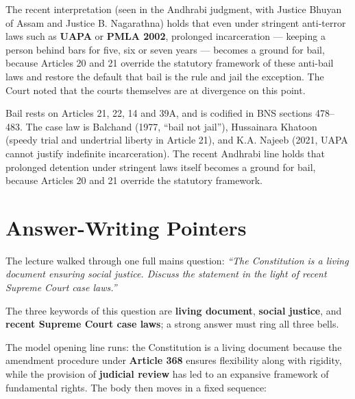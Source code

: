 \begin{CriticalPoint}
The recent interpretation (seen in the Andhrabi judgment, with Justice Bhuyan of Assam and
Justice B. Nagarathna) holds that even under stringent anti-terror laws such as
\textbf{UAPA} or \textbf{PMLA 2002}, prolonged incarceration — keeping a person behind
bars for five, six or seven years — becomes a ground for bail, because Articles 20 and 21
override the statutory framework of these anti-bail laws and restore the default that bail
is the rule and jail the exception. The Court noted that the courts themselves are at
divergence on this point.
\end{CriticalPoint}

\begin{QuickRevision}
Bail rests on Articles 21, 22, 14 and 39A, and is codified in BNS sections 478--483. The
case law is Balchand (1977, ``bail not jail''), Hussainara Khatoon (speedy trial and
undertrial liberty in Article 21), and K.A. Najeeb (2021, UAPA cannot justify indefinite
incarceration). The recent Andhrabi line holds that prolonged detention under stringent
laws itself becomes a ground for bail, because Articles 20 and 21 override the statutory
framework.
\end{QuickRevision}

\section*{Answer-Writing Pointers}

The lecture walked through one full mains question: \emph{``The Constitution is a living
document ensuring social justice. Discuss the statement in the light of recent Supreme
Court case laws.''}

\begin{PYQLink}
The three keywords of this question are \textbf{living document}, \textbf{social justice},
and \textbf{recent Supreme Court case laws}; a strong answer must ring all three bells.
\end{PYQLink}

The model opening line runs: the Constitution is a living document because the amendment
procedure under \textbf{Article 368} ensures flexibility along with rigidity, while the
provision of \textbf{judicial review} has led to an expansive framework of fundamental
rights. The body then moves in a fixed sequence:

